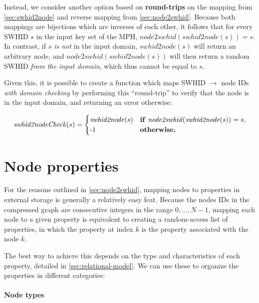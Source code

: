 Instead, we consider another option based on \textbf{round-trips} on the
mapping from \cref{sec:swhid2node} and reverse mapping from
\cref{sec:node2swhid}.  Because both mappings are bijections which are
inverses of each other, it follows that for every \gls{SWHID} $s$ in the input
key set of the \gls{MPH}, $\mathit{node2swhid}(\mathit{swhid2node}(s)) = s$.
In contrast, if $s$ \emph{is not} in the input domain, $\mathit{swhid2node}(s)$
will return an arbitrary node, and
$\mathit{node2swhid}(\mathit{swhid2node}(s))$ will then return a random
\gls{SWHID} \emph{from the input domain}, which thus cannot be equal to $s$.

Given this, it is possible to create a function which maps \gls{SWHID} $\to$
node IDs \emph{with domain checking} by performing this ``round-trip'' to
verify that the node is in the input domain, and returning an error otherwise:

\[
    \mathit{swhid2nodeCheck}(s) =
    \begin{cases}
        \mathit{swhid2node}(s) &
        \text{\textbf{if}}~\mathit{node2swhid}(\mathit{swhid2node}(s)) = s,\\
        \text{-1}            & \text{\textbf{otherwise.}}
    \end{cases}
\]

\section{Node properties}%
\label{sec:node-properties}

For the reasons outlined in \cref{sec:node2swhid}, mapping nodes to properties
in external storage is generally a relatively easy feat. Because the nodes IDs
in the compressed graph are consecutive integers in the range ${0,\ldots,N-1}$,
mapping each node to a given property is equivalent to creating a random-access
list of properties, in which the property at index $k$ is the property
associated with the node $k$.

The best way to achieve this depends on the type and characteristics of each
property, detailed in \cref{sec:relational-model}. We can use these to organize
the properties in different categories:

\paragraph{Node types}

